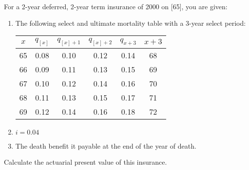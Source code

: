 For a 2-year deferred, 2-year term insurance of 2000 on [65], you are given:
\begin{enumerate}
   \item The following select and ultimate mortality table with a 3-year select period:
     \begin{center}\begin{tabular}{cccccc} $x$ & $q_{[x]}$ & $q_{[x]+1}$ & $q_{[x]+2}$ & $q_{x+3}$ & $x+3$ \\ \hline
             65   &       0.08    &      0.10    &      0.12   &       0.14     &      68  \\
             66   &       0.09    &      0.11    &      0.13   &       0.15     &      69  \\
             67   &       0.10    &      0.12    &      0.14   &       0.16     &      70  \\
             68   &       0.11    &      0.13    &      0.15   &       0.17     &      71  \\
             69   &       0.12    &      0.14    &      0.16   &       0.18     &      72    \end{tabular}\end{center}

   \item $i=0.04$
   \item The death benefit it payable at the end of the year of death.
\end{enumerate}
Calculate the actuarial present value of this insurance.
